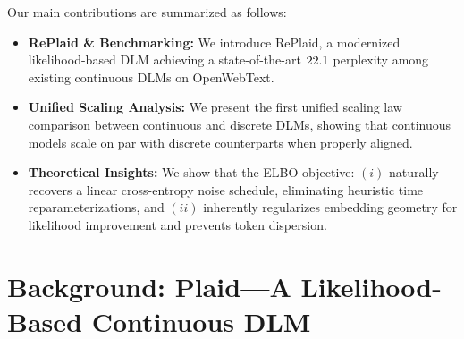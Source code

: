 \documentclass{article}
\begin{document}
%

%

%

%

%

%

%

Our main contributions are summarized as follows:

\begin{itemize}
    \item \textbf{RePlaid \& Benchmarking:} We introduce RePlaid, a modernized likelihood-based DLM achieving a state-of-the-art $22.1$ perplexity among existing continuous DLMs on OpenWebText.

    \item \textbf{Unified Scaling Analysis:} We present the first unified scaling law comparison between continuous and discrete DLMs, showing that continuous models scale on par with discrete counterparts when properly aligned.

    \item \textbf{Theoretical Insights:} We show that the ELBO objective: $(i)$ naturally recovers a linear cross-entropy noise schedule, eliminating heuristic time reparameterizations, and $(ii)$ inherently regularizes embedding geometry for likelihood improvement and prevents token dispersion. %
\end{itemize}
\vspace{-0.5em}
%

%


\section{Background: Plaid---A Likelihood-Based Continuous DLM}
\label{sec:background}

%

%
%

%

%

%

%

%
%
%
%
%
%
%
%
%
%
%
%
%
%
%

%
%
%
%
%
%
%
%
%
%
%
%

%
%

%
%
%
%
%
%
%

%

%

%

%

%


%
\end{document}
